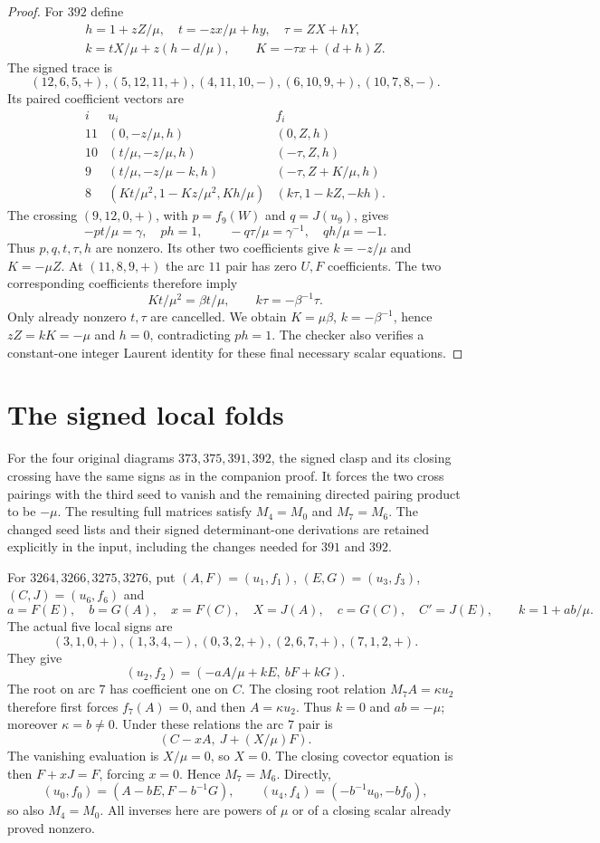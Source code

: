 \documentclass[11pt]{article}
\begin{document}
\begin{proof}
For $392$ define
\[
\begin{gathered}
 h=1+zZ/\mu,\quad t=-zx/\mu+hy,\quad\tau=ZX+hY,\\
 k=tX/\mu+z(h-d/\mu),\qquad K=-\tau x+(d+h)Z.
\end{gathered}
\]
The signed trace is
\[
 (12,6,5,+),(5,12,11,+),(4,11,10,-),
 (6,10,9,+),(10,7,8,-).
\]
Its paired coefficient vectors are
\[
\begin{array}{c|c|c}
i&u_i&f_i\\\hline
11&(0,-z/\mu,h)&(0,Z,h)\\
10&(t/\mu,-z/\mu,h)&(-\tau,Z,h)\\
9&(t/\mu,-z/\mu-k,h)&(-\tau,Z+K/\mu,h)\\
8&(Kt/\mu^2,1-Kz/\mu^2,Kh/\mu)&(k\tau,1-kZ,-kh).
\end{array}
\]
The crossing $(9,12,0,+)$, with
$p=f_9(W)$ and $q=J(u_9)$, gives
\[
 -pt/\mu=\gamma,\quad ph=1,\qquad
 -q\tau/\mu=\gamma^{-1},\quad qh/\mu=-1.
\]
Thus $p,q,t,\tau,h$ are nonzero. Its other two coefficients give
$k=-z/\mu$ and $K=-\mu Z$.
At $(11,8,9,+)$ the arc $11$ pair has zero $U,F$ coefficients.
The two corresponding coefficients therefore imply
\[
 Kt/\mu^2=\beta t/\mu,\qquad k\tau=-\beta^{-1}\tau.
\]
Only already nonzero $t,\tau$ are cancelled. We obtain
$K=\mu\beta$, $k=-\beta^{-1}$, hence
$zZ=kK=-\mu$ and $h=0$, contradicting $ph=1$.
The checker also verifies a constant-one integer Laurent identity
for these final necessary scalar equations.
\end{proof}

\section{The signed local folds}

For the four original diagrams $373,375,391,392$, the signed clasp
and its closing crossing have the same signs as in the companion
proof. It forces the two cross pairings with the third seed to vanish
and the remaining directed pairing product to be $-\mu$.
The resulting full matrices satisfy $M_4=M_0$ and $M_7=M_6$.
The changed seed lists and their signed determinant-one derivations
are retained explicitly in the input, including the changes needed
for $391$ and $392$.

For $3264,3266,3275,3276$, put
$(A,F)=(u_1,f_1)$, $(E,G)=(u_3,f_3)$, $(C,J)=(u_6,f_6)$ and
\[
 a=F(E),\quad b=G(A),\quad x=F(C),\quad X=J(A),\quad
 c=G(C),\quad C'=J(E),\qquad k=1+ab/\mu.
\]
The actual five local signs are
\[
 (3,1,0,+),(1,3,4,-),(0,3,2,+),(2,6,7,+),(7,1,2,+).
\]
They give
\[
 (u_2,f_2)=(-aA/\mu+kE,\ bF+kG).
\]
The root on arc $7$ has coefficient one on $C$.
The closing root relation $M_7A=\kappa u_2$ therefore first forces
$f_7(A)=0$, and then $A=\kappa u_2$.
Thus $k=0$ and $ab=-\mu$; moreover $\kappa=b\ne0$.
Under these relations the arc $7$ pair is
\[
                    (C-xA,\ J+(X/\mu)F).
\]
The vanishing evaluation is $X/\mu=0$, so $X=0$.
The closing covector equation is then $F+xJ=F$, forcing $x=0$.
Hence $M_7=M_6$. Directly,
\[
 (u_0,f_0)=(A-bE,F-b^{-1}G),\qquad
 (u_4,f_4)=(-b^{-1}u_0,-bf_0),
\]
so also $M_4=M_0$.
All inverses here are powers of $\mu$ or of a closing scalar already
proved nonzero.
\end{document}
